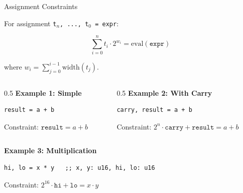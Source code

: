 \documentclass[aspectratio=169,11pt]{beamer}
\begin{document}
\begin{frame}[fragile]{Assignment Constraints}

For assignment \texttt{t$_n$, ..., t$_0$ = expr}:

\[
\sum_{i=0}^{n} t_i \cdot 2^{w_i} = \text{eval}(\texttt{expr})
\]

where $w_i = \sum_{j=0}^{i-1} \text{width}(t_j)$.

\vspace{1em}

\begin{columns}
\begin{column}{0.5\textwidth}
\textbf{Example 1: Simple}
\begin{lstlisting}[style=zkasm]
result = a + b
\end{lstlisting}
Constraint: $\texttt{result} = a + b$
\end{column}

\begin{column}{0.5\textwidth}
\textbf{Example 2: With Carry}
\begin{lstlisting}[style=zkasm]
carry, result = a + b
\end{lstlisting}
Constraint: $2^n \cdot \texttt{carry} + \texttt{result} = a + b$
\end{column}
\end{columns}

\vspace{1em}

\textbf{Example 3: Multiplication}
\begin{lstlisting}[style=zkasm]
hi, lo = x * y   ;; x, y: u16, hi, lo: u16
\end{lstlisting}
Constraint: $2^{16} \cdot \texttt{hi} + \texttt{lo} = x \cdot y$
\end{frame}
\end{document}
